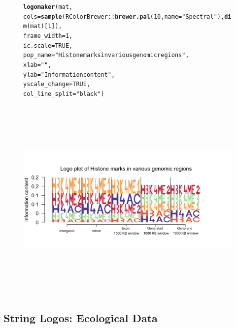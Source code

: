 \documentclass[12pt]{article}\usepackage[]{graphicx}\usepackage[usenames,dvipsnames]{color}
\makeatletter
\newcommand{\hlnum}[1]{\textcolor[rgb]{0.686,0.059,0.569}{#1}}%
\newcommand{\hlstr}[1]{\textcolor[rgb]{0.192,0.494,0.8}{#1}}%
\newcommand{\hlopt}[1]{\textcolor[rgb]{0,0,0}{#1}}%
\newcommand{\hlstd}[1]{\textcolor[rgb]{0.345,0.345,0.345}{#1}}%
\newcommand{\hlkwc}[1]{\textcolor[rgb]{0.333,0.667,0.333}{#1}}%
\newcommand{\hlkwd}[1]{\textcolor[rgb]{0.737,0.353,0.396}{\textbf{#1}}}%
\newenvironment{kframe}{%
 \def\at@end@of@kframe{}%
 \ifinner\ifhmode%
  \def\at@end@of@kframe{\end{minipage}}%
  \begin{minipage}{\columnwidth}%
 \fi\fi%
 \def\FrameCommand##1{\hskip\@totalleftmargin \hskip-\fboxsep
 \colorbox{shadecolor}{##1}\hskip-\fboxsep
     \hskip-\linewidth \hskip-\@totalleftmargin \hskip\columnwidth}%
 \MakeFramed {\advance\hsize-\width
   \@totalleftmargin\z@ \linewidth\hsize
   \@setminipage}}%
 {\par\unskip\endMakeFramed%
 \at@end@of@kframe}
\newenvironment{knitrout}{}{} %
\makeatother
\begin{document}
\begin{figure}[h]
\begin{center}
\begin{knitrout}
\color{fgcolor}\begin{kframe}
\begin{alltt}
\hlkwd{logomaker}\hlstd{(mat,}
          \hlkwc{cols}\hlstd{=} \hlkwd{sample}\hlstd{(RColorBrewer}\hlopt{::}\hlkwd{brewer.pal}\hlstd{(}\hlnum{10}\hlstd{,}\hlkwc{name} \hlstd{=} \hlstr{"Spectral"}\hlstd{),} \hlkwd{dim}\hlstd{(mat)[}\hlnum{1}\hlstd{]),}
          \hlkwc{frame_width} \hlstd{=} \hlnum{1}\hlstd{,}
          \hlkwc{ic.scale} \hlstd{=} \hlnum{TRUE}\hlstd{,}
          \hlkwc{pop_name} \hlstd{=} \hlstr{"Histone marks in various genomic regions"}\hlstd{,}
          \hlkwc{xlab} \hlstd{=} \hlstr{""}\hlstd{,}
          \hlkwc{ylab} \hlstd{=} \hlstr{"Information content"}\hlstd{,}
          \hlkwc{yscale_change} \hlstd{=} \hlnum{TRUE}\hlstd{,}
          \hlkwc{col_line_split} \hlstd{=} \hlstr{"black"}\hlstd{)}
\end{alltt}
\end{kframe}
\includegraphics[width=8.5in,height=4in]{figure/logolas_use_9-1} 

\end{knitrout}
\end{center}
\end{figure}

\newpage

\subsection{String Logos:  Ecological Data}
\end{document}
